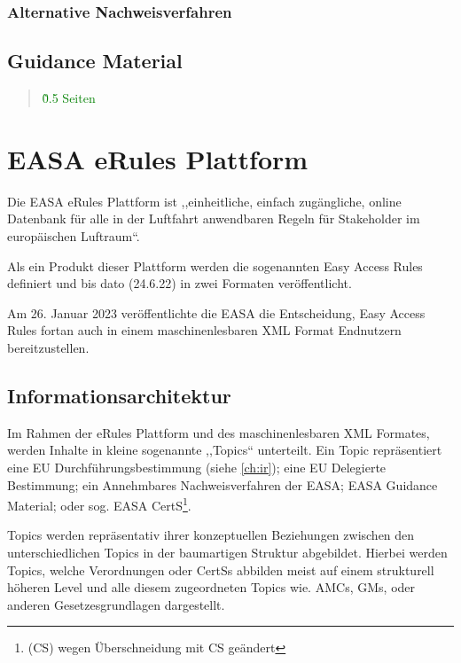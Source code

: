    \subsubsection{Alternative Nachweisverfahren}
        
        

\subsection{Guidance Material}

\begin{quote}
\textcolor{green}{\~0.5 Seiten}
\end{quote}
        \pagebreak
    \section{EASA eRules Plattform}

    Die \ac{EASA} eRules Plattform ist ,,einheitliche, einfach zugängliche, online Datenbank für alle in der Luftfahrt anwendbaren Regeln für Stakeholder im europäischen Luftraum``.
    \cite[5]{easa_xml_doc}

    Als ein Produkt dieser Plattform werden die sogenannten Easy Access Rules definiert und bis dato (24.6.22) in zwei Formaten veröffentlicht. 

    
Am 26. Januar 2023 veröffentlichte die EASA die Entscheidung, Easy Access Rules fortan auch in einem maschinenlesbaren XML Format Endnutzern bereitzustellen. \cite{easa_xml_publication}


\subsection{Informationsarchitektur}

    Im Rahmen der eRules Plattform und des maschinenlesbaren \ac{XML} Formates, werden Inhalte in kleine sogenannte ,,Topics`` unterteilt.
    Ein Topic repräsentiert eine \ac{EU} Durchführungsbestimmung (siehe \ref{ch:ir}); eine \ac{EU} Delegierte Bestimmung; ein Annehmbares Nachweisverfahren der \ac{EASA}; \ac{EASA} Guidance Material; oder sog. \ac{EASA} \acf{CertS}\footnote{(CS) wegen Überschneidung mit \acf{CS} geändert}. \cite[S. 5f]{easa_xml_doc}
    
Topics werden repräsentativ ihrer konzeptuellen Beziehungen zwischen den unterschiedlichen Topics in der baumartigen Struktur abgebildet.
Hierbei werden Topics, welche Verordnungen oder \acp{CertS} abbilden meist auf einem strukturell höheren Level und alle diesem zugeordneten Topics wie. \acsp{AMC}, \acsp{GM}, oder anderen Gesetzesgrundlagen dargestellt.


